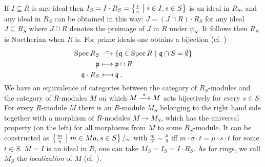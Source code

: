 \documentclass[a4paper,parskip=half,numbers=enddot, DIV=12]{scrreprt}
\begin{document}
If $I\subseteq R$ is any ideal then $I_S = I\cdot R_S = \left\{\frac{i}{s}\ \middle|\  i\in I, s\in S\right\}$ is an ideal in $R_S$, and any ideal in $R_S$ can be obtained in this way: $J= (J\sqcap R)\cdot R_S$ for any ideal $J\subseteq R_S$ where $J\sqcap R$ denotes the preimage of $J$ in $R$ under $\psi_S$. It follows then $R_S$ is Noetherian when $R$ is. For prime ideals one obtains a bijection (cf. \cite[Corollary~2.3.1]{alg1})
\begin{align*}
\Spec R_S & \isomorphism\left\{\qq\in\Spec R\st \qq\cap S=\emptyset\right\}\\
\pp &\longmapsto \pp\sqcap R\\
\qq\cdot R_S &\longmapsfrom \qq\;.
\end{align*}
We have an equivalence of categories between the category of $R_S$-modules and the category of $R$-modules $M$ on which $M \morphism[s\cdot] M$ acts bijectively for every $s\in S$. For every $R$-module $M$ there is an $R$-module $M_S$ belonging to the right hand side together with a morphism of $R$-modules $M\to M_S$, which has the universal property (on the left) for all morphisms from $M$ to some $R_S$-module. It can be constructed as $\left\{\frac{m}{s}\ \middle|\  m \in M a, s\in S\right\}/_\sim$ with $\frac{m}{s}\sim \frac{\mu}{\sigma}$ iff $m\cdot\sigma\cdot t = \mu\cdot s\cdot t$ for some $t\in S$. $M=I$ is an ideal in $R$, one can take $M_S = I_S = I\cdot R_S$. As for rings, we call $M_S$  the \emph{localization} of $M$ (cf. \cite[Proposition~2.3.2]{alg1}).
\end{document}
